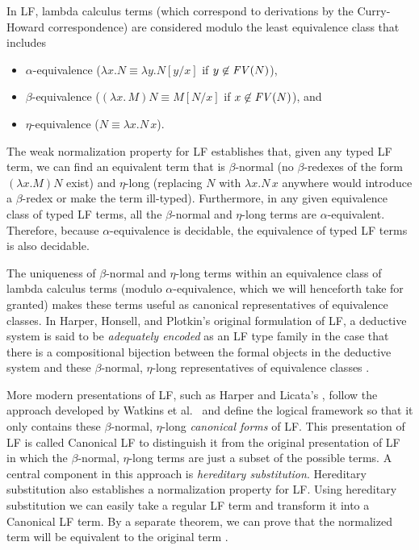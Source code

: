 In LF, lambda calculus terms (which correspond to derivations by the
Curry-Howard correspondence) are considered modulo the least
equivalence class that includes
\begin{itemize}
\item $\alpha$-equivalence ($\lambda x.N \equiv \lambda y.N[y/x]$ if 
$y \not\in {\it FV}(N)$), 
\item $\beta$-equivalence 
($(\lambda x.\,M)N \equiv M[N/x]$ if $x \not\in {\it FV}(N)$), and 
\item $\eta$-equivalence ($N \equiv \lambda x.N\,x$).
\end{itemize}
The weak normalization property for LF establishes that, given any
typed LF term, we can find an equivalent term that is $\beta$-normal
(no $\beta$-redexes of the form $(\lambda x.M) N$ exist) and
$\eta$-long (replacing $N$ with $\lambda x.N\,x$ anywhere would
introduce a $\beta$-redex or make the term ill-typed).  Furthermore,
in any given equivalence class of typed LF terms, all the
$\beta$-normal and $\eta$-long terms are $\alpha$-equivalent.
Therefore, because $\alpha$-equivalence is decidable, the equivalence
of typed LF terms is also decidable. 

The uniqueness of $\beta$-normal and $\eta$-long terms within an
equivalence class of lambda calculus terms (modulo
$\alpha$-equivalence, which we will henceforth take for granted) makes
these terms useful as canonical representatives of equivalence
classes. In Harper, Honsell, and Plotkin's original formulation
of LF, a deductive system is said to be {\it adequately encoded} as
an LF type family in the case that there is a compositional bijection
between the formal objects in the deductive system and these
$\beta$-normal, $\eta$-long representatives of equivalence classes
\cite{harper93framework}.

More modern presentations of LF, such as Harper and Licata's
\cite{harper07mechanizing}, follow the approach developed by Watkins
et al.~\cite{watkins02concurrent} and define the logical framework so
that it only contains these $\beta$-normal, $\eta$-long {\it canonical
  forms} of LF. This presentation of LF is called Canonical LF to
distinguish it from the original presentation of LF in which the
$\beta$-normal, $\eta$-long terms are just a subset of the possible
terms. A central component in this approach is {\it hereditary
  substitution}.  Hereditary substitution also establishes a
normalization property for LF. Using hereditary substitution we can
easily take a regular LF term and transform it into a Canonical LF
term. By a separate theorem, we can prove that the normalized term
will be equivalent to the original term
\cite{martens12lf}. %

